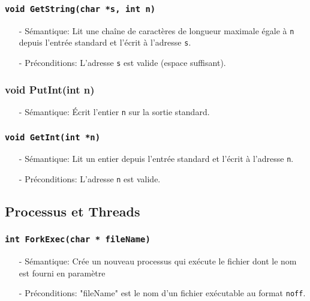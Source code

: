 \documentclass[11pt]{article}
\theoremstyle{definition}
\begin{document}
\subsubsection{\texttt{void GetString(char *s, int n)}}
\begin{itemize}
\item[-] Sémantique:
  Lit une chaîne de caractères de longueur maximale égale à \texttt{n} depuis l'entrée standard et
  l'écrit à l'adresse \texttt{s}.
\item[-] Préconditions: L'adresse \texttt{s} est valide (espace suffisant).
\end{itemize}

\subsubsection{void PutInt(int n)}
\begin{itemize}
\item[-] Sémantique: Écrit l'entier \texttt{n} sur la sortie standard.
\end{itemize}

\subsubsection{\texttt{void GetInt(int *n)}}
\begin{itemize}
\item[-] Sémantique: Lit un entier depuis l'entrée standard et l'écrit à l'adresse \texttt{n}.
\item[-] Préconditions: L'adresse \texttt{n} est valide.
\end{itemize}

\subsection{Processus et Threads}

\subsubsection{\texttt{int ForkExec(char * fileName)}}
 \begin{itemize}
 \item[-] Sémantique: Crée un nouveau processus qui exécute le fichier dont le nom est fourni en paramètre
\item[-] Préconditions: "fileName" est le nom d'un fichier exécutable au format \texttt{noff}.
 \end{itemize}
\end{document}
